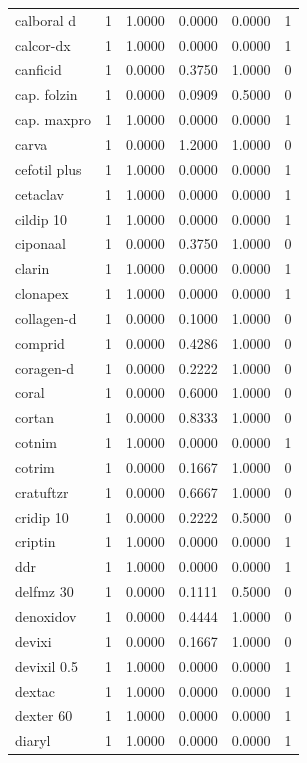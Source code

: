 \begin{longtable}{p{3.0cm}rrrrr}
calboral d & 1 & 1.0000 & 0.0000 & 0.0000 & 1 \\
calcor-dx & 1 & 1.0000 & 0.0000 & 0.0000 & 1 \\
canficid & 1 & 0.0000 & 0.3750 & 1.0000 & 0 \\
cap. folzin & 1 & 0.0000 & 0.0909 & 0.5000 & 0 \\
cap. maxpro & 1 & 1.0000 & 0.0000 & 0.0000 & 1 \\
carva & 1 & 0.0000 & 1.2000 & 1.0000 & 0 \\
cefotil plus & 1 & 1.0000 & 0.0000 & 0.0000 & 1 \\
cetaclav & 1 & 1.0000 & 0.0000 & 0.0000 & 1 \\
cildip 10 & 1 & 1.0000 & 0.0000 & 0.0000 & 1 \\
ciponaal & 1 & 0.0000 & 0.3750 & 1.0000 & 0 \\
clarin & 1 & 1.0000 & 0.0000 & 0.0000 & 1 \\
clonapex & 1 & 1.0000 & 0.0000 & 0.0000 & 1 \\
collagen-d & 1 & 0.0000 & 0.1000 & 1.0000 & 0 \\
comprid & 1 & 0.0000 & 0.4286 & 1.0000 & 0 \\
coragen-d & 1 & 0.0000 & 0.2222 & 1.0000 & 0 \\
coral & 1 & 0.0000 & 0.6000 & 1.0000 & 0 \\
cortan & 1 & 0.0000 & 0.8333 & 1.0000 & 0 \\
cotnim & 1 & 1.0000 & 0.0000 & 0.0000 & 1 \\
cotrim & 1 & 0.0000 & 0.1667 & 1.0000 & 0 \\
cratuftzr & 1 & 0.0000 & 0.6667 & 1.0000 & 0 \\
cridip 10 & 1 & 0.0000 & 0.2222 & 0.5000 & 0 \\
criptin & 1 & 1.0000 & 0.0000 & 0.0000 & 1 \\
ddr & 1 & 1.0000 & 0.0000 & 0.0000 & 1 \\
delfmz 30 & 1 & 0.0000 & 0.1111 & 0.5000 & 0 \\
denoxidov & 1 & 0.0000 & 0.4444 & 1.0000 & 0 \\
devixi & 1 & 0.0000 & 0.1667 & 1.0000 & 0 \\
devixil 0.5 & 1 & 1.0000 & 0.0000 & 0.0000 & 1 \\
dextac & 1 & 1.0000 & 0.0000 & 0.0000 & 1 \\
dexter 60 & 1 & 1.0000 & 0.0000 & 0.0000 & 1 \\
diaryl & 1 & 1.0000 & 0.0000 & 0.0000 & 1 \\

\end{longtable}

